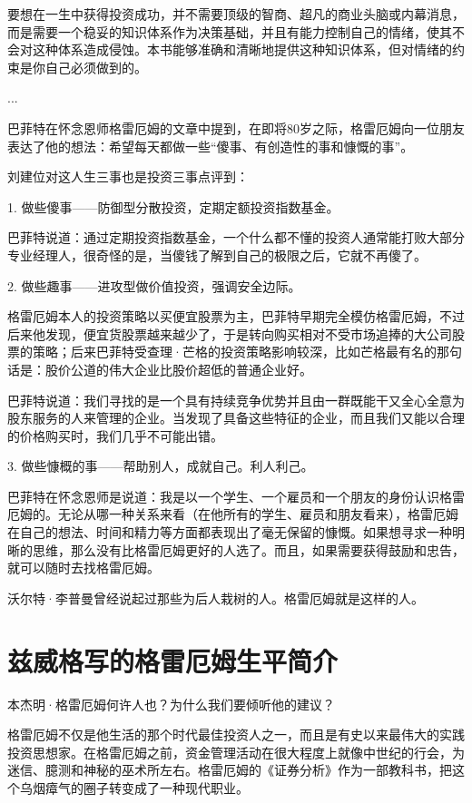 \documentclass[12pt,oneside]{book}
\begin{document}
要想在一生中获得投资成功，并不需要顶级的智商、超凡的商业头脑或内幕消息，而是需要一个稳妥的知识体系作为决策基础，并且有能力控制自己的情绪，使其不会对这种体系造成侵蚀。本书能够准确和清晰地提供这种知识体系，但对情绪的约束是你自己必须做到的。

...

巴菲特在怀念恩师格雷厄姆的文章中提到，在即将80岁之际，格雷厄姆向一位朋友表达了他的想法：希望每天都做一些“傻事、有创造性的事和慷慨的事”。

刘建位对这人生三事也是投资三事点评到：

1. 做些傻事——防御型分散投资，定期定额投资指数基金。

巴菲特说道：通过定期投资指数基金，一个什么都不懂的投资人通常能打败大部分专业经理人，很奇怪的是，当傻钱了解到自己的极限之后，它就不再傻了。

2. 做些趣事——进攻型做价值投资，强调安全边际。

格雷厄姆本人的投资策略以买便宜股票为主，巴菲特早期完全模仿格雷厄姆，不过后来他发现，便宜货股票越来越少了，于是转向购买相对不受市场追捧的大公司股票的策略；后来巴菲特受查理·芒格的投资策略影响较深，比如芒格最有名的那句话是：股价公道的伟大企业比股价超低的普通企业好。

巴菲特说道：我们寻找的是一个具有持续竞争优势并且由一群既能干又全心全意为股东服务的人来管理的企业。当发现了具备这些特征的企业，而且我们又能以合理的价格购买时，我们几乎不可能出错。


3. 做些慷概的事——帮助别人，成就自己。利人利己。

巴菲特在怀念恩师是说道：我是以一个学生、一个雇员和一个朋友的身份认识格雷厄姆的。无论从哪一种关系来看（在他所有的学生、雇员和朋友看来），格雷厄姆在自己的想法、时间和精力等方面都表现出了毫无保留的慷慨。如果想寻求一种明晰的思维，那么没有比格雷厄姆更好的人选了。而且，如果需要获得鼓励和忠告，就可以随时去找格雷厄姆。

沃尔特·李普曼曾经说起过那些为后人栽树的人。格雷厄姆就是这样的人。

\section{兹威格写的格雷厄姆生平简介}
本杰明·格雷厄姆何许人也？为什么我们要倾听他的建议？

格雷厄姆不仅是他生活的那个时代最佳投资人之一，而且是有史以来最伟大的实践投资思想家。在格雷厄姆之前，资金管理活动在很大程度上就像中世纪的行会，为迷信、臆测和神秘的巫术所左右。格雷厄姆的《证券分析》作为一部教科书，把这个乌烟瘴气的圈子转变成了一种现代职业。
\end{document}
